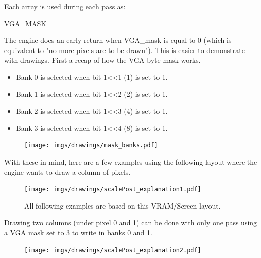  \par
 \begin{minipage}{\textwidth}

\end{minipage}
\par
Each  array is used during each pass  as:\\
\par
 VGA\_MASK = \\
 \par
 The engine does an early return when VGA\_mask is equal to 0 (which is equivalent to "no more pixels are to be drawn"). This is easier to demonstrate with drawings. First a recap of how the VGA byte mask works.
\begin{itemize}
\item Bank 0 is selected when bit 1<<1 (1) is set to 1.
\item Bank 1 is selected when bit 1<<2 (2) is set to 1.
\item Bank 2 is selected when bit 1<<3 (4) is set to 1.
\item Bank 3 is selected when bit 1<<4 (8) is set to 1.
\end{itemize}
\par


\begin{figure}[H]
\centering
 \texttt{[image: imgs/drawings/mask\_banks.pdf]}
 \end{figure}


With these in mind, here are a few examples using the following layout where the engine wants to draw a column of pixels.
\begin{figure}[H]
\centering
 \texttt{[image: imgs/drawings/scalePost\_explanation1.pdf]}
 \caption{All following examples are based on this VRAM/Screen layout.}
 \end{figure}


 Drawing two columns (under pixel 0 and 1) can be done with only one pass using a VGA mask set to 3 to write in banks 0 and 1.\\
 \par
 \begin{minipage}{\textwidth}

\end{minipage}
\par

 \begin{figure}[H]
 \centering
 \texttt{[image: imgs/drawings/scalePost\_explanation2.pdf]}
 \end{figure}




